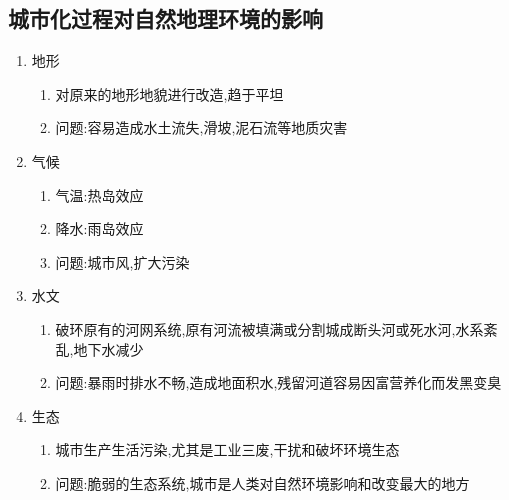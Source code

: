\documentclass[a4paper]{article}
\begin{document}
    \subsection{城市化过程对自然地理环境的影响}
    \begin{enumerate}
        \item 地形
        \begin{enumerate}
            \item 对原来的地形地貌进行改造,趋于平坦
            \item 问题:容易造成水土流失,滑坡,泥石流等地质灾害
        \end{enumerate}
        \item 气候
        \begin{enumerate}
            \item 气温:热岛效应
            \item 降水:雨岛效应
            \item 问题:城市风,扩大污染
        \end{enumerate}
        \item 水文
        \begin{enumerate}
            \item 破环原有的河网系统,原有河流被填满或分割城成断头河或死水河,水系紊乱,地下水减少
            \item 问题:暴雨时排水不畅,造成地面积水,残留河道容易因富营养化而发黑变臭
        \end{enumerate}
        \item 生态
        \begin{enumerate}
            \item 城市生产生活污染,尤其是工业三废,干扰和破坏环境生态
            \item 问题:脆弱的生态系统,城市是人类对自然环境影响和改变最大的地方
        \end{enumerate}
    \end{enumerate}
\end{document}
